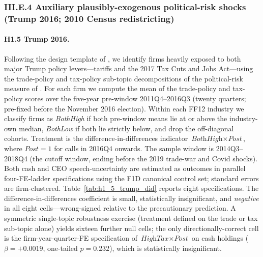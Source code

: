 \subsubsection*{III.E.4 Auxiliary plausibly-exogenous political-risk shocks (Trump 2016; 2010 Census redistricting)}
\label{sec:main:endo:trump_redist}

\paragraph{H1.5 Trump 2016.}
Following the design template of , we identify firms heavily exposed to both major Trump policy levers---tariffs and the 2017 Tax Cuts and Jobs Act---using the trade-policy and tax-policy sub-topic decompositions of the political-risk measure of . For each firm we compute the mean of the trade-policy and tax-policy scores over the five-year pre-window 2011Q4--2016Q3 (twenty quarters; pre-fixed before the November 2016 election). Within each FF12 industry we classify firms as \textit{BothHigh} if both pre-window means lie at or above the industry-own median, \textit{BothLow} if both lie strictly below, and drop the off-diagonal cohorts. Treatment is the difference-in-differences indicator $\textit{BothHigh} \times \textit{Post}$, where $\textit{Post} = 1$ for calls in 2016Q4 onwards. The sample window is 2014Q3--2018Q4 (the  cutoff window, ending before the 2019 trade-war and Covid shocks). Both cash and CEO speech-uncertainty are estimated as outcomes in parallel four-FE-ladder specifications using the F1D canonical control set; standard errors are firm-clustered. Table~\ref{tab:h1_5_trump_did} reports eight specifications. The difference-in-differences coefficient is small, statistically insignificant, and \textit{negative} in all eight cells---wrong-signed relative to the precautionary prediction. A symmetric single-topic robustness exercise (treatment defined on the trade or tax sub-topic alone) yields sixteen further null cells; the only directionally-correct cell is the firm-year-quarter-FE specification of $\textit{HighTax} \times \textit{Post}$ on cash holdings ($\beta = +0.0019$, one-tailed $p = 0.232$), which is statistically insignificant.

